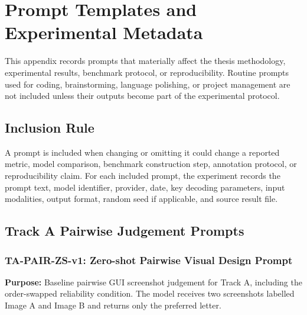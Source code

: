 \chapter{Prompt Templates and Experimental Metadata}
\label{app:prompt-templates}

This appendix records prompts that materially affect the thesis methodology,
experimental results, benchmark protocol, or reproducibility. Routine prompts
used for coding, brainstorming, language polishing, or project management are
not included unless their outputs become part of the experimental protocol.

\section{Inclusion Rule}
\label{app:prompt-inclusion-rule}

A prompt is included when changing or omitting it could change a reported
metric, model comparison, benchmark construction step, annotation protocol, or
reproducibility claim. For each included prompt, the experiment records the
prompt text, model identifier, provider, date, key decoding parameters, input
modalities, output format, random seed if applicable, and source result file.

\section{Track A Pairwise Judgement Prompts}
\label{app:track-a-prompts}

\subsection{TA-PAIR-ZS-v1: Zero-shot Pairwise Visual Design Prompt}
\label{app:prompt-ta-pair-zs-v1}

\textbf{Purpose:} Baseline pairwise GUI screenshot judgement for Track A,
including the order-swapped reliability condition. The model receives two
screenshots labelled Image A and Image B and returns only the preferred letter.

